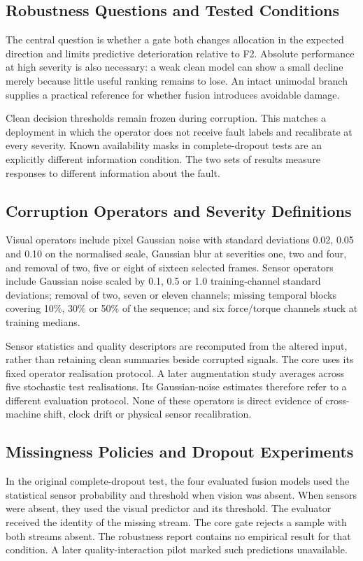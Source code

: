 \subsection{Robustness Questions and Tested Conditions}
The central question is whether a gate both changes allocation in the expected direction
and limits predictive deterioration relative to F2. Absolute performance at high
severity is also necessary: a weak clean model can show a small decline merely because
little useful ranking remains to lose. An intact unimodal branch supplies a practical
reference for whether fusion introduces avoidable damage.

Clean decision thresholds remain frozen during corruption. This matches a deployment in
which the operator does not receive fault labels and recalibrate at every severity.
Known availability masks in complete-dropout tests are an explicitly different
information condition. The two sets of results measure responses to different
information about the fault.

\subsection{Corruption Operators and Severity Definitions}
Visual operators include pixel Gaussian noise with standard deviations 0.02, 0.05 and
0.10 on the normalised scale, Gaussian blur at severities one, two and four, and removal
of two, five or eight of sixteen selected frames. Sensor operators include Gaussian
noise scaled by 0.1, 0.5 or 1.0 training-channel standard deviations; removal of two,
seven or eleven channels; missing temporal blocks covering 10\%, 30\% or 50\% of the
sequence; and six force/torque channels stuck at training medians.

Sensor statistics and quality descriptors are recomputed from the altered input, rather
than retaining clean summaries beside corrupted signals. The core uses its fixed
operator realisation protocol. A later augmentation study averages across five
stochastic test realisations. Its Gaussian-noise estimates therefore refer to a
different evaluation protocol. None of these operators is direct evidence of
cross-machine shift, clock drift or physical sensor recalibration.

\subsection{Missingness Policies and Dropout Experiments}
In the original complete-dropout test, the four evaluated fusion models used the
statistical sensor probability and threshold when vision was absent. When sensors were
absent, they used the visual predictor and its threshold. The evaluator received the
identity of the missing stream. The core gate rejects a sample with both streams absent.
The robustness report contains no empirical result for that condition. A later
quality-interaction pilot marked such predictions unavailable.


